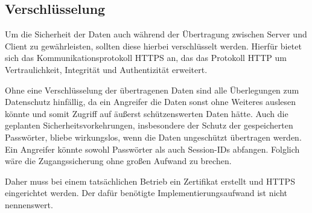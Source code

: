\subsection{Verschlüsselung}

Um die Sicherheit der Daten auch während der Übertragung zwischen Server und Client zu gewährleisten, sollten diese hierbei verschlüsselt werden.
Hierfür bietet sich das Kommunikationsprotokoll \acs{HTTPS} an, das das Protokoll \acs{HTTP} um Vertraulichkeit, Integrität und Authentizität erweitert.

Ohne eine Verschlüsselung der übertragenen Daten sind alle Überlegungen zum Datenschutz hinfällig, da ein Angreifer die Daten sonst ohne Weiteres auslesen könnte und somit Zugriff auf äußerst schützenswerten Daten hätte.
Auch die geplanten Sicherheitsvorkehrungen, insbesondere der Schutz der gespeicherten Passwörter, bliebe wirkungslos, wenn die Daten ungeschützt übertragen werden.
Ein Angreifer könnte sowohl Passwörter als auch Session-IDs abfangen.
Folglich wäre die Zugangssicherung ohne großen Aufwand zu brechen.

Daher muss bei einem tatsächlichen Betrieb ein Zertifikat erstellt und \acs{HTTPS} eingerichtet werden.
Der dafür benötigte Implementierungsaufwand ist nicht nennenswert.
